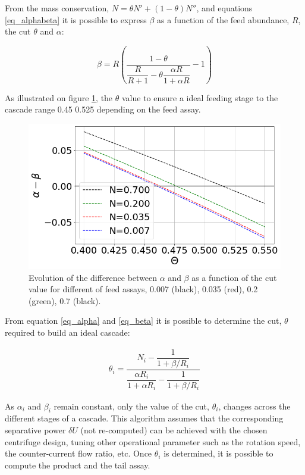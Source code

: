 From the mass conservation, $N = \theta N' + (1-\theta)N''$, and equations
\eqref{eq_alphabeta} it is possible to express $\beta$ as a function of the
feed abundance, $R$, the cut $\theta$ and $\alpha$:

\begin{equation}\label{eq_beta}
    \beta =   R \left(\dfrac{1-\theta}
                     {\dfrac{R}{R+1}- \theta \dfrac{\alpha R}{1+\alpha R}} -1\right)
\end{equation}


As illustrated on figure \ref{fig_a_m_b}, the $\theta$ value to ensure a ideal feeding
stage to the cascade range 0.45 0.525 depending on the feed assay.

\begin{figure}[h!] %
    \centering
    \includegraphics[scale=0.5]{alpha_minus_beta}
    \caption{Evolution of the difference between $\alpha$ and $\beta$ as a
    function of the cut value for different of feed assays, 0.007 (black),
    0.035 (red), 0.2 (green), 0.7 (black). }
    \label{fig_a_m_b}
\end{figure}

From equation \eqref{eq_alpha} and \eqref{eq_beta} it is possible to determine
the cut, $\theta$ required to build an ideal cascade:

\begin{eqnarray}
    \theta_{i} = \dfrac{N_{i} - \dfrac{1}{1 + \beta/R_{i}}}{ \dfrac{\alpha R_{i}}{1 + \alpha R_{i}} -
           \dfrac{1}{1 + \beta/R_{i}}}
           \label{eq_theta}
\end{eqnarray}


As $\alpha_{i}$ and $\beta_{i}$ remain constant, only the value of the cut,
$\theta_{i}$, changes across the different stages of a cascade.  This algorithm
assumes that the corresponding separative power $\delta U$ (not re-computed) can
be achieved with the chosen centrifuge design, tuning other operational
parameter such as the rotation speed, the counter-current flow ratio, etc.  Once
$\theta_{i}$ is determined, it is possible to compute the product and the tail
assay.




